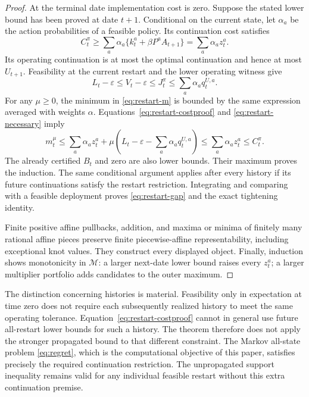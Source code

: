 \begin{proof}
At the terminal date implementation cost is zero. Suppose the stated lower bound has been proved at date $t+1$. Conditional on the current state, let $\alpha_a$ be the action probabilities of a feasible policy. Its continuation cost satisfies
\begin{equation}\label{eq:restart-costproof}
 C_t^\pi\ge\sum_a\alpha_a\{k_t^a+\beta P^aA_{t+1}\}
              =\sum_a\alpha_a z_t^a.
\end{equation}
Its operating continuation is at most the optimal continuation and hence at most $U_{t+1}$. Feasibility at the current restart and the lower operating witness give
\begin{equation}\label{eq:restart-necessary}
 L_t-\varepsilon\le V_t-\varepsilon\le J_t^\pi
                    \le\sum_a\alpha_a q_t^{U,a}.
\end{equation}
For any $\mu\ge0$, the minimum in \eqref{eq:restart-m} is bounded by the same expression averaged with weights $\alpha$. Equations~\eqref{eq:restart-costproof} and \eqref{eq:restart-necessary} imply
\[
 m_t^\mu\le\sum_a\alpha_a z_t^a+
       \mu\left(L_t-\varepsilon-\sum_a\alpha_aq_t^{U,a}\right)
       \le\sum_a\alpha_a z_t^a\le C_t^\pi.
\]
The already certified $B_t$ and zero are also lower bounds. Their maximum proves the induction. The same conditional argument applies after every history if its future continuations satisfy the restart restriction. Integrating and comparing with a feasible deployment proves \eqref{eq:restart-gap} and the exact tightening identity.

Finite positive affine pullbacks, addition, and maxima or minima of finitely many rational affine pieces preserve finite piecewise-affine representability, including exceptional knot values. They construct every displayed object. Finally, induction shows monotonicity in $\mathcal M$: a larger next-date lower bound raises every $z_t^a$; a larger multiplier portfolio adds candidates to the outer maximum.\end{proof}

The distinction concerning histories is material. Feasibility only in expectation at time zero does not require each subsequently realized history to meet the same operating tolerance. Equation~\eqref{eq:restart-costproof} cannot in general use future all-restart lower bounds for such a history. The theorem therefore does not apply the stronger propagated bound to that different constraint. The Markov all-state problem \eqref{eq:regret}, which is the computational objective of this paper, satisfies precisely the required continuation restriction. The unpropagated support inequality remains valid for any individual feasible restart without this extra continuation premise.

